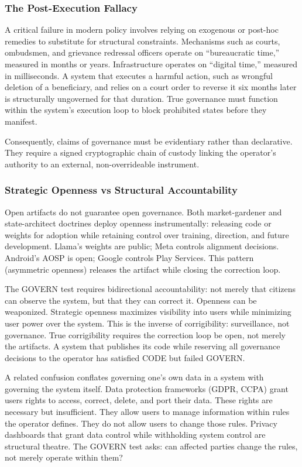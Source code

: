 \subsubsection{The Post-Execution Fallacy}
A critical failure in modern policy involves relying on exogenous or post-hoc remedies to substitute for structural constraints. Mechanisms such as courts, ombudsmen, and grievance redressal officers operate on ``bureaucratic time,'' measured in months or years. Infrastructure operates on ``digital time,'' measured in milliseconds. A system that executes a harmful action, such as wrongful deletion of a beneficiary, and relies on a court order to reverse it six months later is structurally ungoverned for that duration. True governance must function within the system's execution loop to block prohibited states before they manifest.

Consequently, claims of governance must be evidentiary rather than declarative. They require a signed cryptographic chain of custody linking the operator's authority to an external, non-overrideable instrument.

\subsubsection{Strategic Openness vs Structural Accountability}

Open artifacts do not guarantee open governance. Both market-gardener and state-architect doctrines deploy openness instrumentally: releasing code or weights for adoption while retaining control over training, direction, and future development. Llama's weights are public; Meta controls alignment decisions. Android's AOSP is open; Google controls Play Services. This pattern (asymmetric openness) releases the artifact while closing the correction loop.

The GOVERN test requires bidirectional accountability: not merely that citizens can observe the system, but that they can correct it. Openness can be weaponized. Strategic openness maximizes visibility into users while minimizing user power over the system. This is the inverse of corrigibility: surveillance, not governance. True corrigibility requires the correction loop be open, not merely the artifacts. A system that publishes its code while reserving all governance decisions to the operator has satisfied CODE but failed GOVERN.

A related confusion conflates governing one's own data in a system with governing the system itself. Data protection frameworks (GDPR, CCPA) grant users rights to access, correct, delete, and port their data. These rights are necessary but insufficient. They allow users to manage information within rules the operator defines. They do not allow users to change those rules. Privacy dashboards that grant data control while withholding system control are structural theatre. The GOVERN test asks: can affected parties change the rules, not merely operate within them?

